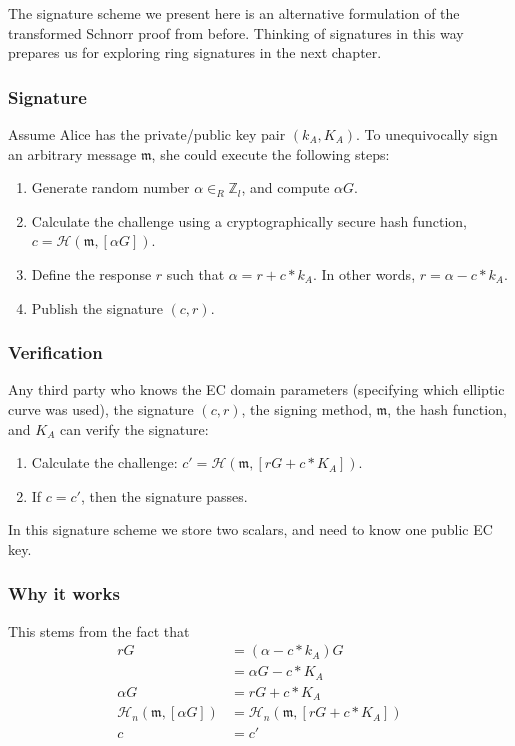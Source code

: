 The signature scheme we present here is an alternative formulation of the transformed Schnorr proof from before. Thinking of signatures in this way prepares us for exploring ring signatures in the next chapter.

\subsubsection*{Signature}

Assume Alice has the private/public key pair \((k_A, K_A)\). To unequivocally sign an arbitrary message $\mathfrak{m}$, she could execute the following steps:

\begin{enumerate}
	\item Generate random number $\alpha \in_R \mathbb{Z}_l$, and compute $\alpha G$.
	\item Calculate the challenge using a cryptographically secure hash function, \(c = \mathcal{H}(\mathfrak{m},[\alpha G])\).
	\item Define the response $r$ such that $\alpha = r + c*k_A$. In other words, $r = \alpha - c*k_A$.
	\item Publish the signature $(c, r)$.
\end{enumerate}

\subsubsection*{Verification}

Any third party who knows the EC domain parameters (specifying which elliptic curve was used), the signature $(c, r)$, the signing method, $\mathfrak{m}$, the hash function, and $K_A$ can verify the signature:

\begin{enumerate}
	\item Calculate the challenge: \(c' = \mathcal{H}(\mathfrak{m},[r G + c*K_A])\).
	\item If $c = c'$, then the signature passes.
\end{enumerate}

In this signature scheme we store two scalars, and need to know one public EC key.

\subsubsection*{Why it works}

This stems from the fact that
\begin{align*}
  	 r G &= (\alpha - c*k_A) G \\
  	  	 &= \alpha G - c*K_A \\
\alpha G &= r G + c*K_A \\
\mathcal{H}_n(\mathfrak{m},[\alpha G]) &= \mathcal{H}_n(\mathfrak{m},[r G + c*K_A]) \\
       c &= c'
\end{align*}

